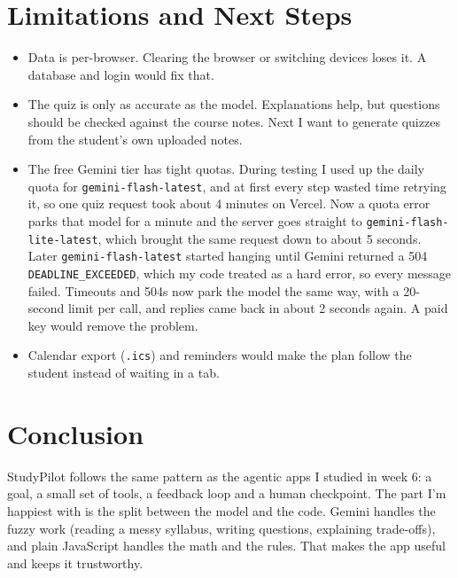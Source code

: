 \documentclass[11pt]{article}
\begin{document}
\section{Limitations and Next Steps}
\begin{itemize}
  \item Data is per-browser. Clearing the browser or switching devices loses it. A database
        and login would fix that.
  \item The quiz is only as accurate as the model. Explanations help, but questions should be
        checked against the course notes. Next I want to generate quizzes from the student's
        own uploaded notes.
  \item The free Gemini tier has tight quotas. During testing I used up the daily quota for
        \texttt{gemini-flash-latest}, and at first every step wasted time retrying it, so one
        quiz request took about 4 minutes on Vercel. Now a quota error parks that model for a
        minute and the server goes straight to \texttt{gemini-flash-lite-latest}, which brought
        the same request down to about 5 seconds. Later \texttt{gemini-flash-latest} started
        hanging until Gemini returned a 504 \texttt{DEADLINE\_EXCEEDED}, which my code treated as
        a hard error, so every message failed. Timeouts and 504s now park the model the same way,
        with a 20-second limit per call, and replies came back in about 2 seconds again. A paid
        key would remove the problem.
  \item Calendar export (\texttt{.ics}) and reminders would make the plan follow the student
        instead of waiting in a tab.
\end{itemize}

\section{Conclusion}
StudyPilot follows the same pattern as the agentic apps I studied in week 6: a goal, a small
set of tools, a feedback loop and a human checkpoint. The part I'm happiest with is the split
between the model and the code. Gemini handles the fuzzy work (reading a messy syllabus,
writing questions, explaining trade-offs), and plain JavaScript handles the math and the rules.
That makes the app useful and keeps it trustworthy.
\end{document}

